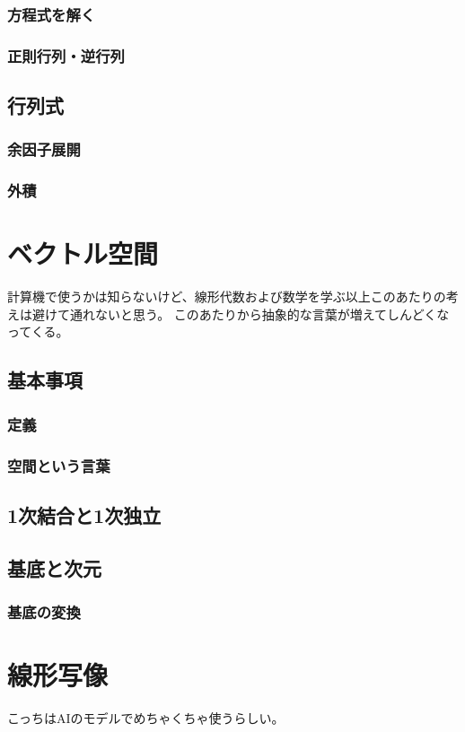 \documentclass[10pt]{jsarticle}
\numberwithin{equation}{section}%
\begin{document}
\subsubsection{方程式を解く}
\subsubsection{正則行列・逆行列}
\subsection{行列式}
\subsubsection{余因子展開}
\subsubsection{外積}

\section{ベクトル空間}
計算機で使うかは知らないけど、線形代数および数学を学ぶ以上このあたりの考えは避けて通れないと思う。
このあたりから抽象的な言葉が増えてしんどくなってくる。
\subsection{基本事項}
\subsubsection{定義}
\subsubsection{空間という言葉}
\subsection{1次結合と1次独立}
\subsection{基底と次元}
\subsubsection{基底の変換}
\section{線形写像}
こっちはAIのモデルでめちゃくちゃ使うらしい。
\end{document}
